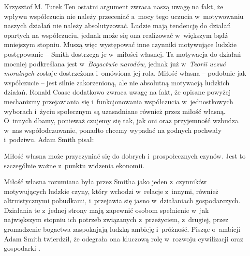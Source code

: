 \begin{artplenv}{Krzysztof M. Turek}
Ten ostatni argument zwraca naszą uwagę na fakt, że wpływu współczucia nie należy przeceniać a~mocy tego
uczucia w~motywowaniu naszych działań nie należy absolutyzować.
Ludzie mają tendencję do działań opartych na współczuciu, jednak może się ona realizować w~większym bądź mniejszym stopniu.
Muszą więc występować inne czynniki motywujące ludzkie postępowanie -- Smith dostrzega
je w~miłości własnej. Ta motywacja do działań mocniej podkreślana jest w~\textit{Bogactwie
narodów}, jednak już w~\textit{Teorii uczuć moralnych} zostaje dostrzeżona i~omówiona jej rola.
Miłość własna -- podobnie jak współczucie -- jest silnie zakorzenioną, ale nie absolutną motywacją ludzkich działań. Ronald Coase
\parencite*[s.~9]{coase_adam_1976}
dodatkowo zwraca uwagę na fakt, że opisane powyżej mechanizmy przejawiania
się i~funkcjonowania współczucia w~jednostkowych wyborach i~życiu społecznym są uzasadniane również przez miłość
własną. O~innych dbamy, ponieważ czujemy się tak, jak oni oraz przyjemność wzbudza w~nas współodczuwanie, ponadto chcemy wypadać
na godnych pochwały i~podziwu. Adam Smith
\parencite*[s.~69]{smith_theory_2005}
pisał: 

Miłość własna może przyczyniać się do dobrych i~prospołecznych czynów. Jest to szczególnie ważne z~punktu widzenia
ekonomii. 


Miłość własna rozumiana była przez Smitha jako jeden z~czynników motywujących ludzkie czyny, który
wchodzi w~relacje z~innymi, również altruistycznymi pobudkami, i~przejawia się jasno w~działaniach
gospodarczych. Działania te z~jednej
strony mają zapewnić osobom spełnienie w~jak największym stopniu ich potrzeb związanych z~przeżyciem, z~drugiej, przez
gromadzenie bogactwa zaspokajają ludzką ambicję i~próżność. Pisząc o~ambicji Adam Smith twierdził, że odegrała ona
kluczową rolę w~rozwoju cywilizacji oraz gospodarki
\parencite[s.~164]{smith_theory_1969}.


\end{artplenv}
